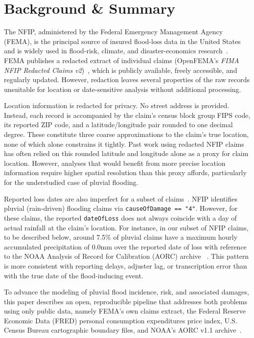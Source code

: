 \section*{Background \& Summary}

The NFIP, administered by the Federal Emergency Management Agency
(FEMA), is the principal source of insured flood-loss data in the
United States and is widely used in flood-risk, climate, and
disaster-economics research~\cite{nelson-mercer_pluvial_2025, wing_new_2020,shin_systematic_2022, petkov_learning_2025,garcia_reconstructing_2025,yang_predicting_2022,salas_learning_2023}.
%
FEMA publishes a redacted extract of individual claims (OpenFEMA's \emph{FIMA NFIP Redacted Claims v2})~\cite{fema_nfip_claims_v2}, which is publicly available, freely accessible, and regularly updated.
%
However, redaction leaves several properties of the raw records unsuitable for location or date-sensitive analysis without additional processing.

Location information is redacted for privacy. No street address is provided.
%
Instead, each record is accompanied by the claim's census block group FIPS code, its reported ZIP code, and a latitude/longitude pair rounded to one decimal degree.
%
These constitute three coarse approximations to the claim's true location, none of which alone constrains it tightly.
%
Past work using redacted NFIP claims has often relied on this rounded latitude and longitude alone as a proxy for claim location.
%
However, analyses that would benefit from more precise location information require higher spatial resolution than this proxy affords, particularly for the understudied case of pluvial flooding.

Reported loss dates are also imperfect for a subset of claims~\cite{shin_systematic_2022}.
%
NFIP identifies pluvial (rain-driven) flooding claims via \texttt{causeOfDamage == "4"}.
%
However, for these claims, the reported \texttt{dateOfLoss} does not always coincide with a day of actual rainfall at the claim's location.
%
For instance, in our subset of NFIP claims, to be described below, around 7.5\% of pluvial claims have a maximum hourly accumulated precipitation of 0.0mm over the reported date of loss with reference to the NOAA Analysis of Record for Calibration (AORC) archive ~\cite{fall_analysis_2023}.
%
This pattern is more consistent with reporting delays, adjuster lag, or transcription error than with the true date of the flood-inducing event.

To advance the modeling of pluvial flood incidence, risk, and associated damages, this paper describes an open, reproducible pipeline that addresses both problems using only public data, namely FEMA's own claims extract, the Federal
Reserve Economic Data (FRED) personal consumption expenditures price
index, U.S. Census Bureau cartographic boundary files, and NOAA's AORC
v1.1 archive~\cite{fall_analysis_2023}. 

